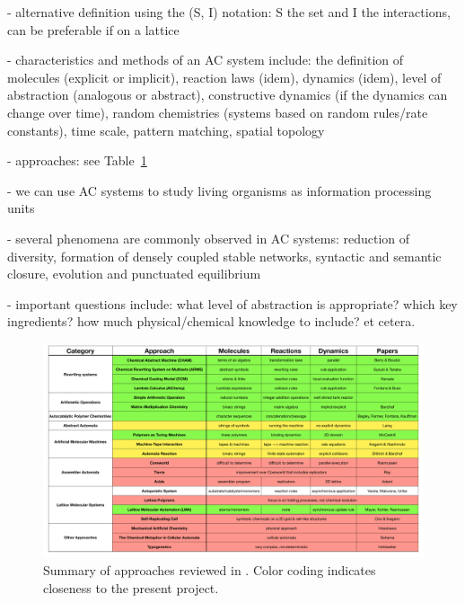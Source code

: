 \documentclass[11pt]{article}
\begin{document}
\begin{markdown}
- alternative definition using the (S, I) notation: S the set and I the interactions, can be preferable if on a lattice
    
- characteristics and methods of an AC system include: the definition of molecules (explicit or implicit), reaction laws (idem), dynamics (idem), level of abstraction (analogous or abstract), constructive dynamics (if the dynamics can change over time), random chemistries (systems based on random rules/rate constants), time scale, pattern matching, spatial topology
    
- approaches: see Table~\ref{tab:dittrich2001}
    
- we can use AC systems to study living organisms as information processing units
    
- several phenomena are commonly observed in AC systems: reduction of diversity, formation of densely coupled stable networks, syntactic and semantic closure, evolution and punctuated equilibrium
    
- important questions include: what level of abstraction is appropriate? which key ingredients? how much physical/chemical knowledge to include? et cetera.

\end{markdown}

\begin{figure}[hbt]
  \includegraphics[width=\textwidth]{figures/dittrich2001/dittrich-table.pdf}
  \caption{Summary of approaches reviewed in \cite{dittrich_artificial_2001}. Color coding indicates closeness to the present project.}
  \label{tab:dittrich2001}
\end{figure}



\clearpage

\subsubsection{\texorpdfstring{\cite{liu_definition_2020}}{}}
\end{document}
